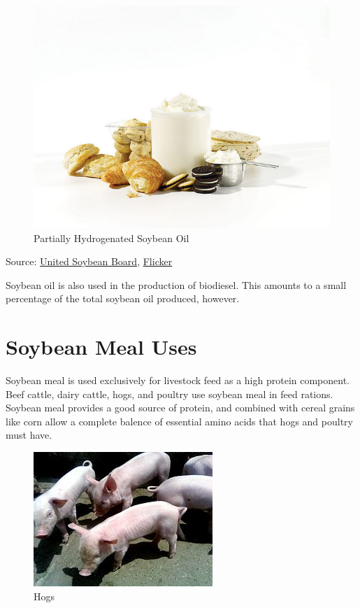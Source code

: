 \documentclass[]{book}
\theoremstyle{definition}
\theoremstyle{definition}
\theoremstyle{remark}
\begin{document}
\begin{figure}[htbp]
\centering
\includegraphics{images/hydrogenated_oil.jpg}
\caption{Partially Hydrogenated Soybean Oil}
\end{figure}

Source: \href{http://unitedsoybean.org/}{United Soybean Board},
\href{https://www.flickr.com/photos/unitedsoybean/16910795086/}{Flicker}

Soybean oil is also used in the production of biodiesel. This amounts to
a small percentage of the total soybean oil produced, however.

\section{Soybean Meal Uses}\label{soybean-meal-uses}

Soybean meal is used exclusively for livestock feed as a high protein
component. Beef cattle, dairy cattle, hogs, and poultry use soybean meal
in feed rations. Soybean meal provides a good source of protein, and
combined with cereal grains like corn allow a complete balence of
essential amino acids that hogs and poultry must have.

\begin{figure}[htbp]
\centering
\includegraphics{images/pigs.jpg}
\caption{Hogs}
\end{figure}
\end{document}

